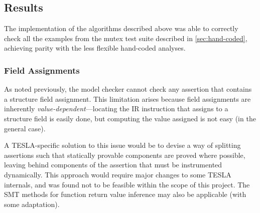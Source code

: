 \subsection{Results} \label{sec:model-limits}

The implementation of the algorithms described above was able to correctly check
all the examples from the mutex test suite described in
\autoref{sec:hand-coded}, achieving parity with the less flexible hand-coded
analyses.

\subsubsection{Field Assignments}

As noted previously, the model checker cannot check any assertion that
contains a structure field assignment. This limitation arises because
field assignments are inherently \emph{value-dependent}---locating the
IR instruction that assigns to a structure field is easily done, but
computing the value assigned is not easy (in the general case).

A TESLA-specific solution to this issue would be to devise a way of
splitting assertions such that statically provable components are proved
where possible, leaving behind components of the assertion that must be
instrumented dynamically. This approach would require major changes to
some TESLA internals, and was found not to be feasible within the scope
of this project. The SMT methods for function return value inference may also be
applicable (with some adaptation).
